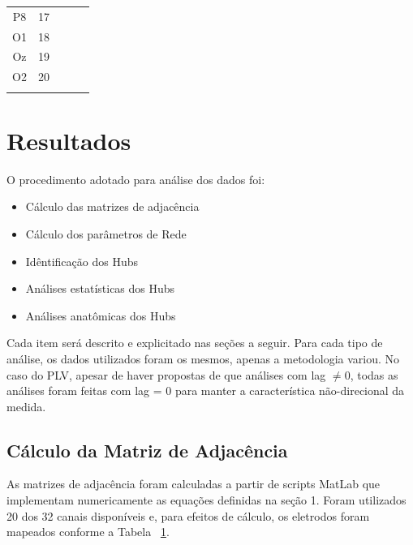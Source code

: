 \documentclass[
	12pt,				%
	openright,			%
	twoside,			%
	a4paper,			%
	english,			%
	french,				%
	spanish,			%
	brazil				%
	]{abntex2}
\begin{document}
\begin{table}[h]
\begin{tabular}{cclll}
\multicolumn{1}{|c|}{P8}  & \multicolumn{1}{c|}{17} &                      &                      &  \\ \cline{1-2}
\multicolumn{1}{|c|}{O1}  & \multicolumn{1}{c|}{18} &                      &                      &  \\ \cline{1-2}
\multicolumn{1}{|c|}{Oz}  & \multicolumn{1}{c|}{19} &                      &                      &  \\ \cline{1-2}
\multicolumn{1}{|c|}{O2}  & \multicolumn{1}{c|}{20} &                      &                      &  \\ \cline{1-2}
\label{table: eletrodos}
\end{tabular}
\end{table}





\chapter{Resultados}
O procedimento adotado para análise dos dados foi:
\begin{itemize}
    \item Cálculo das matrizes de adjacência
    \item Cálculo dos parâmetros de Rede
    \item Idêntificação dos Hubs
    \item Análises estatísticas dos Hubs
    \item Análises anatômicas dos Hubs
\end{itemize}
Cada item será descrito e explicitado nas seções a seguir. Para cada tipo de análise, os dados utilizados foram os mesmos, apenas a metodologia variou. No caso do PLV, apesar de haver propostas de que análises com lag $\neq 0$, todas as análises foram feitas com lag = 0 para manter a característica não-direcional da medida.

\section{Cálculo da Matriz de Adjacência}

As matrizes de adjacência foram calculadas a partir de scripts MatLab que implementam numericamente as equações definidas na seção 1. Foram utilizados 20 dos 32 canais disponíveis e, para efeitos de cálculo, os eletrodos foram mapeados conforme a Tabela ~\ref{table: eletrodos}.
\end{document}
